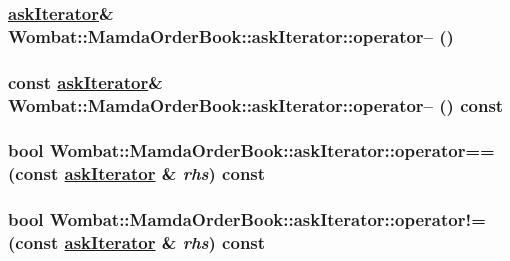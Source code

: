 \hypertarget{classWombat_1_1MamdaOrderBook_1_1askIterator_e51f1bb1e54a8a52e46c477837191e28}{
\subsubsection[operator--]{\setlength{\rightskip}{0pt plus 5cm}\hyperlink{classWombat_1_1MamdaOrderBook_1_1askIterator}{ask\-Iterator}\& Wombat::Mamda\-Order\-Book::ask\-Iterator::operator-- ()}}
\label{classWombat_1_1MamdaOrderBook_1_1askIterator_e51f1bb1e54a8a52e46c477837191e28}


\hypertarget{classWombat_1_1MamdaOrderBook_1_1askIterator_994e57b3097dcbbdc887005135303cc2}{
\subsubsection[operator--]{\setlength{\rightskip}{0pt plus 5cm}const \hyperlink{classWombat_1_1MamdaOrderBook_1_1askIterator}{ask\-Iterator}\& Wombat::Mamda\-Order\-Book::ask\-Iterator::operator-- () const}}
\label{classWombat_1_1MamdaOrderBook_1_1askIterator_994e57b3097dcbbdc887005135303cc2}


\hypertarget{classWombat_1_1MamdaOrderBook_1_1askIterator_8be6c858cd853645131ab12eb02d2e21}{
\subsubsection[operator==]{\setlength{\rightskip}{0pt plus 5cm}bool Wombat::Mamda\-Order\-Book::ask\-Iterator::operator== (const \hyperlink{classWombat_1_1MamdaOrderBook_1_1askIterator}{ask\-Iterator} \& {\em rhs}) const}}
\label{classWombat_1_1MamdaOrderBook_1_1askIterator_8be6c858cd853645131ab12eb02d2e21}


\hypertarget{classWombat_1_1MamdaOrderBook_1_1askIterator_e19edae3ac36629bf47fa3c81408f5a8}{
\subsubsection[operator"!=]{\setlength{\rightskip}{0pt plus 5cm}bool Wombat::Mamda\-Order\-Book::ask\-Iterator::operator!= (const \hyperlink{classWombat_1_1MamdaOrderBook_1_1askIterator}{ask\-Iterator} \& {\em rhs}) const}}
\label{classWombat_1_1MamdaOrderBook_1_1askIterator_e19edae3ac36629bf47fa3c81408f5a8}


